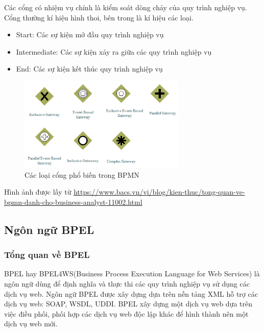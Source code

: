 Các cổng có nhiệm vụ chính là kiểm soát dòng chảy của quy trình nghiệp vụ. Cổng thường kí hiệu hình thoi, bên trong là kí hiệu các loại.
\begin{itemize}
	\item Start: Các sự kiện mở đầu quy trình nghiệp vụ
	\item Intermediate: Các sự kiện xảy ra giữa các quy trình nghiệp vụ
	\item End: Các sự kiện kết thúc quy trình nghiệp vụ
\end{itemize}
\begin{figure}[!htp]
	\begin{center}
		\includegraphics[width=8cm]{img/theory/BPMN/Gateway.png}
	\end{center}
	\caption{Các loại cổng phổ biến trong BPMN}
\end{figure}
\begin{flushleft}
	Hình ảnh được lấy từ \url{https://www.bacs.vn/vi/blog/kien-thuc/tong-quan-ve-bpmn-danh-cho-business-analyst-11002.html}
\end{flushleft}



\subsection{Ngôn ngữ BPEL}
\subsubsection{Tổng quan về BPEL}
BPEL hay BPEL4WS(Business Process Execution Language for Web Services) là ngôn ngữ dùng để định nghĩa và thực thi các quy trình nghiệp vụ sử dụng các dịch vụ web. Ngôn ngữ BPEL được xây dựng dựa trên nền tảng XML hỗ trợ các dịch vụ web: SOAP, WSDL, UDDI. BPEL xây dựng một dịch vụ web dựa trên việc điều phối, phối hợp các dịch vụ web độc lập khác để hình thành nên một dịch vụ web mới.
